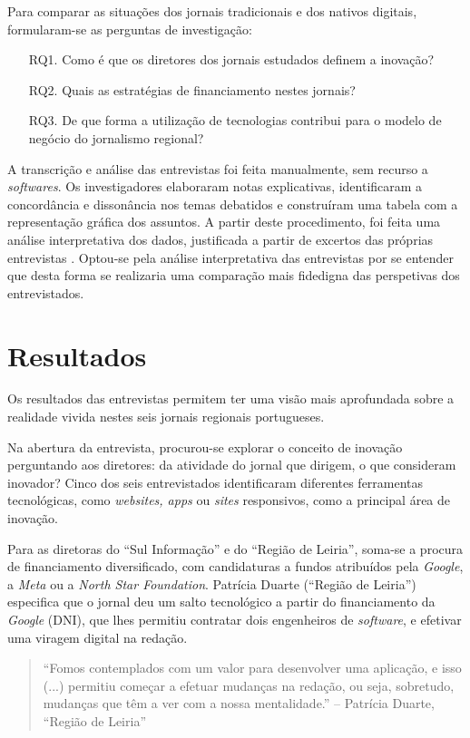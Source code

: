 \documentclass[portuguese]{textolivre}
\begin{document}
Para comparar as situações dos jornais tradicionais e dos nativos
digitais, formularam-se as perguntas de investigação:
\begin{itemize}
    \item[RQ1.] Como é que os diretores dos jornais estudados definem a inovação?
    \item[RQ2.] Quais as estratégias de financiamento nestes jornais?
    \item[RQ3.] De que forma a utilização de tecnologias contribui para o modelo de
negócio do jornalismo regional?
\end{itemize}
 
A transcrição e análise das entrevistas foi feita manualmente, sem
recurso a \emph{softwares}. Os investigadores elaboraram notas
explicativas, identificaram a concordância e dissonância nos temas
debatidos e construíram uma tabela com a representação gráfica dos
assuntos. A partir deste procedimento, foi feita uma análise
interpretativa dos dados, justificada a partir de excertos das próprias
entrevistas \cite{bauer2008social}. Optou-se pela análise
interpretativa das entrevistas por se entender que desta forma se
realizaria uma comparação mais fidedigna das perspetivas dos
entrevistados.


\section{Resultados}
Os resultados das entrevistas permitem ter uma visão mais aprofundada
sobre a realidade vivida nestes seis jornais regionais portugueses.

Na abertura da entrevista, procurou-se explorar o conceito de inovação
perguntando aos diretores: da atividade do jornal que dirigem, o que
consideram inovador? Cinco dos seis entrevistados identificaram
diferentes ferramentas tecnológicas, como \emph{websites, apps} ou
\emph{sites} responsivos, como a principal área de inovação.

Para as diretoras do ``Sul Informação'' e do ``Região de Leiria'',
soma-se a procura de financiamento diversificado, com candidaturas a
fundos atribuídos pela \emph{Google}, a \emph{Meta }ou a \emph{North
Star Foundation}. Patrícia Duarte (``Região de Leiria'') especifica que
o jornal deu um salto tecnológico a partir do financiamento da
\emph{Google} (DNI), que lhes permitiu contratar dois engenheiros de
\emph{software}, e efetivar uma viragem digital na redação.

\begin{quote}
``Fomos contemplados com um valor para desenvolver uma aplicação, e isso
(...) permitiu começar a efetuar mudanças na redação, ou seja,
sobretudo, mudanças que têm a ver com a nossa mentalidade.'' -- Patrícia
Duarte, ``Região de Leiria''
\end{quote}
\end{document}
